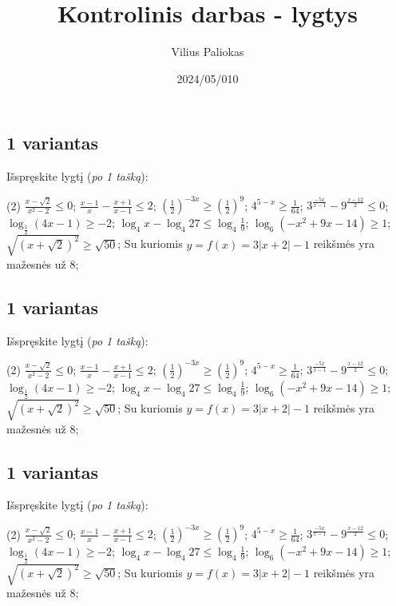 \documentclass[a4paper]{article}
\title{Kontrolinis darbas - lygtys}
\author{Vilius Paliokas}
\date{2024/05/010}
\begin{document}
\thispagestyle{fancy}

\titlespacing*{\subsection}{0pt}{.75ex}{0.75ex}

\subsection*{1 variantas}

Išspręskite lygtį (\textit{po 1 tašką}):
\begin{tasks}[item-format={\normalfont}, after-item-skip=2mm](2)
      \task $\frac{x-\sqrt{2}}{x^2-2}\leqslant 0$;
      \task $\frac{x-1}{x}-\frac{x+1}{x-1} \leqslant 2$;
      \task $(\frac{1}{2})^{-3x} \geqslant (\frac{1}{2})^9$;
      \task $4^{5-x} \geqslant \frac{1}{64}$;
      \task $3^{\frac{-5x}{x-1}}-9^{\frac{x-12}{2}} \leqslant 0$;
      \task $\log_{\frac{1}{2}}(4x-1) \geq -2$;
      \task $\log_{4}x-\log_{4}27 \leqslant \log_{4}\frac{1}{9}$;
      \task $\log_{6}(-x^2+9x-14) \geq 1$;
      \task $\sqrt{(x+\sqrt{2})^2} \geqslant \sqrt{50}$;
      \task Su kuriomis $y=f(x)=3|x+2|-1$ reikšmės yra mažesnės už 8;
\end{tasks}
\subsection*{1 variantas}

Išspręskite lygtį (\textit{po 1 tašką}):
\begin{tasks}[item-format={\normalfont}, after-item-skip=2mm](2)
      \task $\frac{x-\sqrt{2}}{x^2-2}\leqslant 0$;
      \task $\frac{x-1}{x}-\frac{x+1}{x-1} \leqslant 2$;
      \task $(\frac{1}{2})^{-3x} \geqslant (\frac{1}{2})^9$;
      \task $4^{5-x} \geqslant \frac{1}{64}$;
      \task $3^{\frac{-5x}{x-1}}-9^{\frac{x-12}{2}} \leqslant 0$;
      \task $\log_{\frac{1}{2}}(4x-1) \geq -2$;
      \task $\log_{4}x-\log_{4}27 \leqslant \log_{4}\frac{1}{9}$;
      \task $\log_{6}(-x^2+9x-14) \geq 1$;
      \task $\sqrt{(x+\sqrt{2})^2} \geqslant \sqrt{50}$;
      \task Su kuriomis $y=f(x)=3|x+2|-1$ reikšmės yra mažesnės už 8;
\end{tasks}

\subsection*{1 variantas}

Išspręskite lygtį (\textit{po 1 tašką}):
\begin{tasks}[item-format={\normalfont}, after-item-skip=2mm](2)
      \task $\frac{x-\sqrt{2}}{x^2-2}\leqslant 0$;
      \task $\frac{x-1}{x}-\frac{x+1}{x-1} \leqslant 2$;
      \task $(\frac{1}{2})^{-3x} \geqslant (\frac{1}{2})^9$;
      \task $4^{5-x} \geqslant \frac{1}{64}$;
      \task $3^{\frac{-5x}{x-1}}-9^{\frac{x-12}{2}} \leqslant 0$;
      \task $\log_{\frac{1}{2}}(4x-1) \geq -2$;
      \task $\log_{4}x-\log_{4}27 \leqslant \log_{4}\frac{1}{9}$;
      \task $\log_{6}(-x^2+9x-14) \geq 1$;
      \task $\sqrt{(x+\sqrt{2})^2} \geqslant \sqrt{50}$;
      \task Su kuriomis $y=f(x)=3|x+2|-1$ reikšmės yra mažesnės už 8;
\end{tasks}
\end{document}
